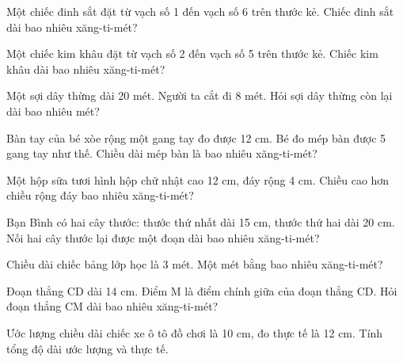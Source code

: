 \begin{ex}
Một chiếc đinh sắt đặt từ vạch số 1 đến vạch số 6 trên thước kẻ. Chiếc đinh sắt dài bao nhiêu xăng-ti-mét?
\end{ex}

\begin{ex}
Một chiếc kim khâu đặt từ vạch số 2 đến vạch số 5 trên thước kẻ. Chiếc kim khâu dài bao nhiêu xăng-ti-mét?
\end{ex}

\begin{ex}
Một sợi dây thừng dài 20 mét. Người ta cắt đi 8 mét. Hỏi sợi dây thừng còn lại dài bao nhiêu mét?
\end{ex}

\begin{ex}
Bàn tay của bé xòe rộng một gang tay đo được 12 cm. Bé đo mép bàn được 5 gang tay như thế. Chiều dài mép bàn là bao nhiêu xăng-ti-mét?
\end{ex}

\begin{ex}
Một hộp sữa tươi hình hộp chữ nhật cao 12 cm, đáy rộng 4 cm. Chiều cao hơn chiều rộng đáy bao nhiêu xăng-ti-mét?
\end{ex}

\begin{ex}
Bạn Bình có hai cây thước: thước thứ nhất dài 15 cm, thước thứ hai dài 20 cm. Nối hai cây thước lại được một đoạn dài bao nhiêu xăng-ti-mét?
\end{ex}

\begin{ex}
Chiều dài chiếc bảng lớp học là 3 mét. Một mét bằng bao nhiêu xăng-ti-mét?
\end{ex}

\begin{ex}
Đoạn thẳng CD dài 14 cm. Điểm M là điểm chính giữa của đoạn thẳng CD. Hỏi đoạn thẳng CM dài bao nhiêu xăng-ti-mét?
\end{ex}

\begin{ex}
Ước lượng chiều dài chiếc xe ô tô đồ chơi là 10 cm, đo thực tế là 12 cm. Tính tổng độ dài ước lượng và thực tế.
\end{ex}
